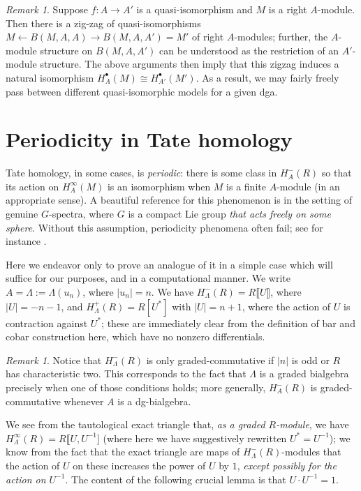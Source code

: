 \documentclass{memo-l}
\theoremstyle{definition}
\theoremstyle{remark}
\newtheorem{remark}[theorem]{Remark}
\numberwithin{section}{chapter}
\numberwithin{equation}{chapter}
\begin{document}
\begin{remark}\label{rmk:dg-invar}
Suppose $f: A \to A'$ is a quasi-isomorphism and $M$ is a right $A$-module. Then there is a zig-zag of quasi-isomorphisms $M \leftarrow B(M, A, A) \to B(M, A, A') = M'$ of right $A$-modules; further, the $A$-module structure on $B(M,A,A')$ can be understood as the restriction of an $A'$-module structure. The above arguments then imply that this zigzag induces a natural isomorphism $H^\bullet_A(M) \cong H^\bullet_{A'}(M')$. As a result, we may fairly freely pass between different quasi-isomorphic models for a given dga. 
\end{remark}

\section{Periodicity in Tate homology}\label{sec:periodic}
Tate homology, in some cases, is \emph{periodic}: there is some class in $H^-_A(R)$ so that its action on $H^\infty_A(M)$ is an isomorphism when $M$ is a finite $A$-module (in an appropriate sense). A beautiful reference for this phenomenon is \cite[Section~III.16]{GreM} in the setting of genuine $G$-spectra, where $G$ is a compact Lie group \emph{that acts freely on some sphere}. Without this assumption, periodicity phenomena often fail; see for instance \cite{NegProducts}.

Here we endeavor only to prove an analogue of it in a simple case which will suffice for our purposes, and in a computational manner. We write $A = \Lambda := \Lambda(u_n)$, where $|u_n| = n$. We have $H^-_\Lambda(R) = R\llbracket U\rrbracket$, where $|U| = -n-1$, and $H^+_\Lambda(R) = R[U^*]$ with $|U| = n+1$, where the action of $U$ is contraction against $U^*$; these are immediately clear from the definition of bar and cobar construction here, which have no nonzero differentials.

\begin{remark}
Notice that $H^-_\Lambda(R)$ is only graded-commutative if $|n|$ is odd or $R$ has characteristic two. This corresponds to the fact that $\Lambda$ is a graded bialgebra precisely when one of those conditions holds; more generally, $H^-_A(R)$ is graded-commutative whenever $A$ is a dg-bialgebra.
\end{remark}

We see from the tautological exact triangle that, \emph{as a graded $R$-module}, we have $H^\infty_\Lambda(R) = R\llbracket U, U^{-1}]$ (where here we have suggestively rewritten $U^* = U^{-1}$); we know from the fact that the exact triangle are maps of $H^-_\Lambda(R)$-modules that the action of $U$ on these increases the power of $U$ by $1$, \emph{except possibly for the action on $U^{-1}$}. The content of the following crucial lemma is that $U \cdot U^{-1} = 1$.
\end{document}
